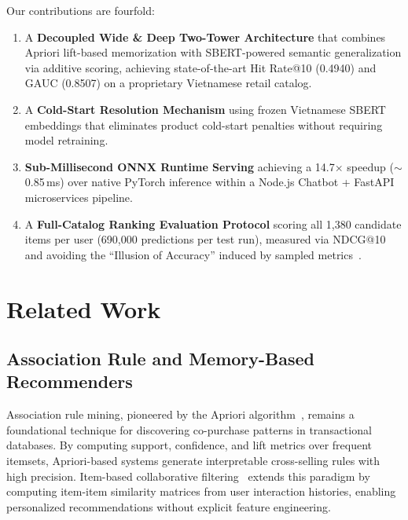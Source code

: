 \documentclass[10pt,conference]{IEEEtran}
\begin{document}
Our contributions are fourfold:
\begin{enumerate}
    \item A \textbf{Decoupled Wide \& Deep Two-Tower Architecture} that combines Apriori lift-based memorization with SBERT-powered semantic generalization via additive scoring, achieving state-of-the-art Hit Rate@10 (0.4940) and GAUC (0.8507) on a proprietary Vietnamese retail catalog.
    \item A \textbf{Cold-Start Resolution Mechanism} using frozen Vietnamese SBERT embeddings that eliminates product cold-start penalties without requiring model retraining.
    \item \textbf{Sub-Millisecond ONNX Runtime Serving} achieving a 14.7$\times$ speedup ($\sim$0.85\,ms) over native PyTorch inference within a Node.js Chatbot + FastAPI microservices pipeline.
    \item A \textbf{Full-Catalog Ranking Evaluation Protocol} scoring all 1,380 candidate items per user (690,000 predictions per test run), measured via NDCG@10~\cite{jarvelin2002cumulated} and avoiding the ``Illusion of Accuracy'' induced by sampled metrics~\cite{krichene2022sampled}.
\end{enumerate}


\section{Related Work}
\label{sec:related_work}

\subsection{Association Rule and Memory-Based Recommenders}
\label{subsec:assoc_rule}

Association rule mining, pioneered by the Apriori algorithm~\cite{agrawal1994fast}, remains a foundational technique for discovering co-purchase patterns in transactional databases. By computing support, confidence, and lift metrics over frequent itemsets, Apriori-based systems generate interpretable cross-selling rules with high precision. Item-based collaborative filtering~\cite{sarwar2001item} extends this paradigm by computing item-item similarity matrices from user interaction histories, enabling personalized recommendations without explicit feature engineering.
\end{document}
